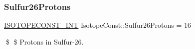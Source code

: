 \subsubsection{\texorpdfstring{Sulfur26\+Protons}{Sulfur26Protons}}
{\footnotesize\ttfamily \mbox{\hyperlink{group___isotope_const-_macros_ga5f18360b3e99483a35c32d789e62621c}{I\+S\+O\+T\+O\+P\+E\+C\+O\+N\+S\+T\+\_\+\+I\+NT}} Isotope\+Const\+::\+Sulfur26\+Protons = 16}

\$ \$ Protons in Sulfur-\/26. 